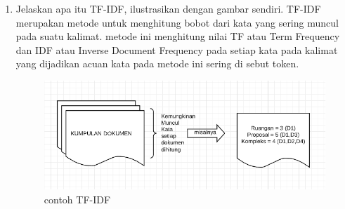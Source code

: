 \begin{enumerate}
\item Jelaskan apa itu TF-IDF, ilustrasikan dengan gambar sendiri.
 TF-IDF merupakan metode untuk menghitung bobot dari kata yang sering muncul pada suatu kalimat. metode ini menghitung nilai TF atau Term Frequency dan IDF atau Inverse Document Frequency pada setiap kata pada kalimat yang dijadikan acuan kata pada metode ini sering di sebut token.
 
\begin{figure}[ht]
\centering
\includegraphics[scale=0.2]{figures/1174002/4/5.PNG}
\caption{contoh TF-IDF}
\label{contoh}
\end{figure}

\end{enumerate}


